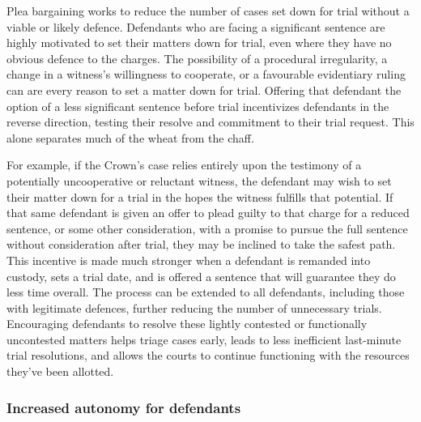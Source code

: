 Plea bargaining works to reduce the number of cases set down for trial without a viable or likely defence. Defendants who are facing a significant sentence are highly motivated to set their matters down for trial, even where they have no obvious defence to the charges. The possibility of a procedural irregularity, a change in a witness's willingness to cooperate, or a favourable evidentiary ruling can are every reason to set a matter down for trial. Offering that defendant the option of a less significant sentence before trial incentivizes defendants in the reverse direction, testing their resolve and commitment to their trial request. This alone separates much of the wheat from the chaff.

For example, if the Crown's case relies entirely upon the testimony of a potentially uncooperative or reluctant witness, the defendant may wish to set their matter down for a trial in the hopes the witness fulfills that potential. If that same defendant is given an offer to plead guilty to that charge for a reduced sentence, or some other consideration, with a promise to pursue the full sentence without consideration after trial, they may be inclined to take the safest path. This incentive is made much stronger when a defendant is remanded into custody, sets a trial date, and is offered a sentence that will guarantee they do less time overall. The process can be extended to all defendants, including those with legitimate defences, further reducing the number of unnecessary trials. Encouraging defendants to resolve these lightly contested or functionally uncontested matters helps triage cases early, leads to less inefficient last-minute trial resolutions, and allows the courts to continue functioning with the resources they've been allotted. 

\subsubsection{Increased autonomy for defendants}

